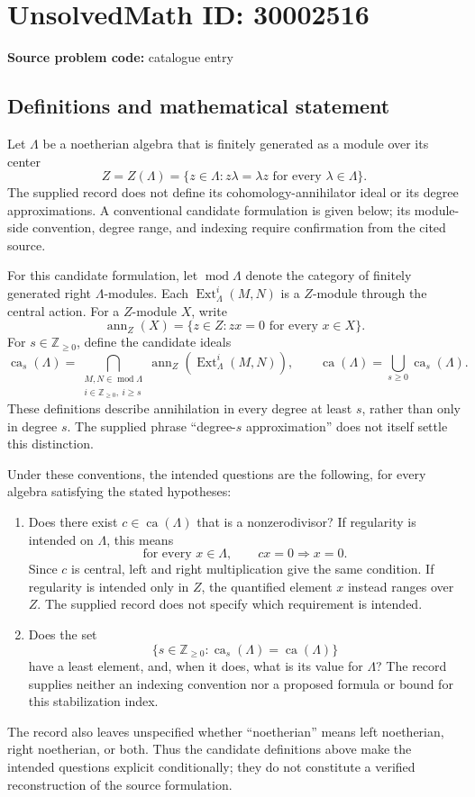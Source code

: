 \documentclass[11pt]{article}
\newcommand{\Z}{\mathbb{Z}}
\begin{document}
\section*{UnsolvedMath ID: 30002516}
\textbf{Source problem code:} catalogue entry
\subsection{Definitions and mathematical statement}
Let \(\Lambda\) be a noetherian algebra that is finitely generated as a module over its center
\[
Z=Z(\Lambda)=\{z\in\Lambda: z\lambda=\lambda z\text{ for every }\lambda\in\Lambda\}.
\]
The supplied record does not define its cohomology-annihilator ideal or its degree approximations. A conventional candidate formulation is given below; its module-side convention, degree range, and indexing require confirmation from the cited source.

For this candidate formulation, let \(\operatorname{mod}\Lambda\) denote the category of finitely generated right \(\Lambda\)-modules. Each \(\operatorname{Ext}^i_\Lambda(M,N)\) is a \(Z\)-module through the central action. For a \(Z\)-module \(X\), write
\[
\operatorname{ann}_Z(X)=\{z\in Z:zx=0\text{ for every }x\in X\}.
\]
For \(s\in\Z_{\geq 0}\), define the candidate ideals
\[
\operatorname{ca}_s(\Lambda)
=
\bigcap_{\substack{M,N\in\operatorname{mod}\Lambda\\ i\in\Z_{\geq 0},\ i\geq s}}
\operatorname{ann}_Z\!\left(\operatorname{Ext}^i_\Lambda(M,N)\right),
\qquad
\operatorname{ca}(\Lambda)=\bigcup_{s\geq 0}\operatorname{ca}_s(\Lambda).
\]
These definitions describe annihilation in every degree at least \(s\), rather than only in degree \(s\). The supplied phrase ``degree-\(s\) approximation'' does not itself settle this distinction.

Under these conventions, the intended questions are the following, for every algebra satisfying the stated hypotheses:
\begin{enumerate}
\item Does there exist \(c\in\operatorname{ca}(\Lambda)\) that is a nonzerodivisor? If regularity is intended on \(\Lambda\), this means
\[
\text{for every }x\in\Lambda,\qquad cx=0\Longrightarrow x=0.
\]
Since \(c\) is central, left and right multiplication give the same condition. If regularity is intended only in \(Z\), the quantified element \(x\) instead ranges over \(Z\). The supplied record does not specify which requirement is intended.
\item Does the set
\[
\{s\in\Z_{\geq 0}:\operatorname{ca}_s(\Lambda)=\operatorname{ca}(\Lambda)\}
\]
have a least element, and, when it does, what is its value for \(\Lambda\)? The record supplies neither an indexing convention nor a proposed formula or bound for this stabilization index.
\end{enumerate}
The record also leaves unspecified whether ``noetherian'' means left noetherian, right noetherian, or both. Thus the candidate definitions above make the intended questions explicit conditionally; they do not constitute a verified reconstruction of the source formulation.
\end{document}
